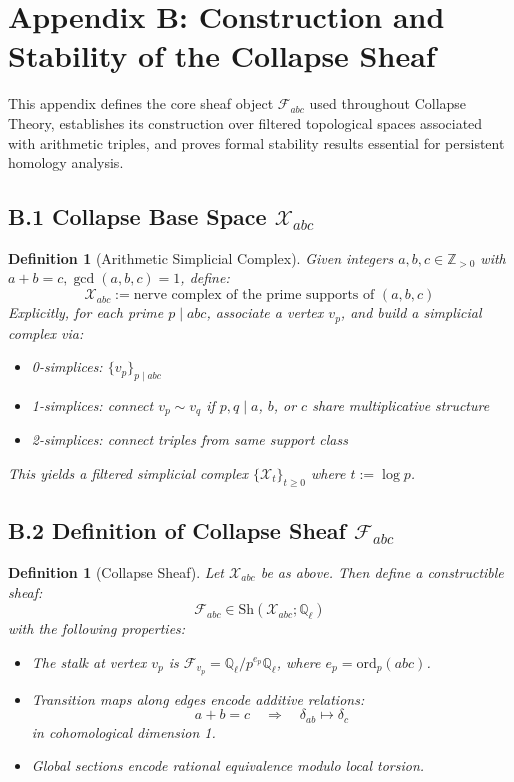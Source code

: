 \documentclass[11pt]{article}
\newtheorem{definition}[theorem]{Definition}
\begin{document}
\section*{Appendix B: Construction and Stability of the Collapse Sheaf}

This appendix defines the core sheaf object \( \mathcal{F}_{abc} \) used throughout Collapse Theory,  
establishes its construction over filtered topological spaces associated with arithmetic triples,  
and proves formal stability results essential for persistent homology analysis.

\subsection*{B.1 Collapse Base Space \( \mathcal{X}_{abc} \)}

\begin{definition}[Arithmetic Simplicial Complex]
Given integers \( a, b, c \in \mathbb{Z}_{>0} \) with \( a + b = c, \gcd(a,b,c)=1 \), define:
\[
\mathcal{X}_{abc} := \text{nerve complex of the prime supports of } (a,b,c)
\]
Explicitly, for each prime \( p \mid abc \), associate a vertex \( v_p \), and build a simplicial complex via:
\begin{itemize}
  \item 0-simplices: \( \{ v_p \}_{p \mid abc} \)
  \item 1-simplices: connect \( v_p \sim v_q \) if \( p,q \mid a \), \( b \), or \( c \) share multiplicative structure
  \item 2-simplices: connect triples from same support class
\end{itemize}
This yields a filtered simplicial complex \( \{ \mathcal{X}_t \}_{t \geq 0} \) where \( t := \log p \).
\end{definition}

\subsection*{B.2 Definition of Collapse Sheaf \( \mathcal{F}_{abc} \)}

\begin{definition}[Collapse Sheaf]
Let \( \mathcal{X}_{abc} \) be as above. Then define a constructible sheaf:
\[
\mathcal{F}_{abc} \in \mathrm{Sh}(\mathcal{X}_{abc}; \mathbb{Q}_\ell)
\]
with the following properties:
\begin{itemize}
  \item The stalk at vertex \( v_p \) is \( \mathcal{F}_{v_p} = \mathbb{Q}_\ell / p^{e_p} \mathbb{Q}_\ell \), where \( e_p = \mathrm{ord}_p(abc) \).
  \item Transition maps along edges encode additive relations:
  \[
  a + b = c \quad \Rightarrow \quad \delta_{ab} \mapsto \delta_c
  \]
  in cohomological dimension 1.
  \item Global sections encode rational equivalence modulo local torsion.
\end{itemize}
\end{definition}
\end{document}
